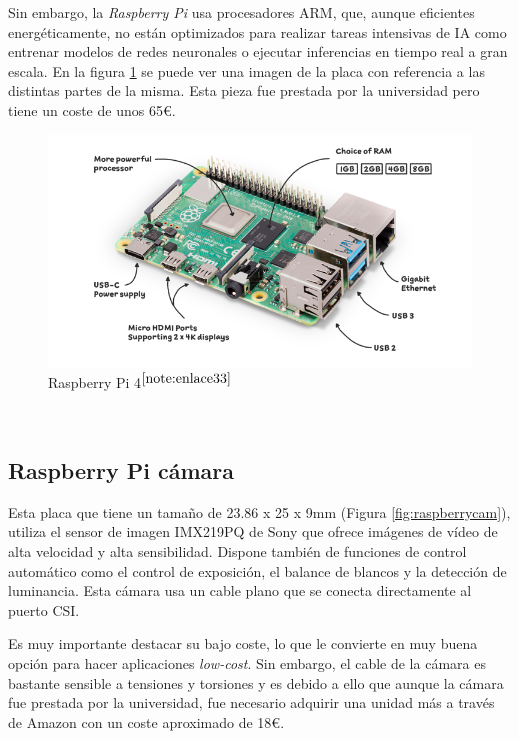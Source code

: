 Sin embargo, la \textit{Raspberry Pi} usa procesadores ARM, que, aunque eficientes energéticamente, no están optimizados para realizar tareas intensivas de \ac{IA} como entrenar modelos de redes neuronales o ejecutar inferencias en tiempo real a gran escala. En la figura \ref{fig:raspberry} se puede ver una imagen de la placa con referencia a las distintas partes de la misma. Esta pieza fue prestada por la universidad pero tiene un coste de unos 65€. 


\begin{figure} [h!]
	\begin{center}
		\includegraphics[width=14cm]{figs/raspberrypi4.png}
	\end{center}
	\caption{Raspberry Pi 4$^{\ref{note:enlace33}}$} 
\label{fig:raspberry}
\end{figure}\

\setcounter{footnote}{33} %

\subsection{Raspberry Pi cámara}

Esta placa que tiene un tamaño de  23.86 x 25 x 9mm (Figura \ref{fig:raspberrycam}), utiliza el sensor de imagen IMX219PQ de Sony que ofrece imágenes de vídeo de alta velocidad y alta sensibilidad. Dispone también de funciones de control automático como el control de exposición, el balance de blancos y la detección de luminancia. Esta cámara usa un cable plano que se conecta directamente al puerto \ac{CSI}.

Es muy importante destacar su bajo coste, lo que le convierte en muy buena opción para hacer aplicaciones \textit{low-cost}. Sin embargo, el cable de la cámara es bastante sensible a tensiones y torsiones y es debido a ello que aunque la cámara fue prestada por la universidad, fue necesario adquirir una unidad más a través de Amazon con un coste aproximado de 18€.    



